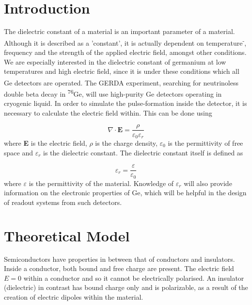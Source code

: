\documentclass[a4paper,11pt]{article}
\begin{document}
\section{Introduction}
\label{s:intro}


The dielectric constant of a material is an important parameter of a material. Although it is described as a 'constant', it is actually dependent on temperature\textsuperscript{\cite{benedict91}-\cite{fukuroi}}, frequency and the strength of the applied electric field, amongst other conditions. We are especially interested in the dielectric constant of germanium at low temperatures and high electric field, since it is under these conditions which all Ge detectors are operated. The GERDA experiment\textsuperscript{\cite{gerda}}, searching for neutrinoless double beta decay in \textsuperscript{76}Ge, will use high-purity Ge detectors operating in cryogenic liquid. In order to simulate the pulse-formation inside the detector, it is necessary to calculate the electric field within. This can be done using

\begin{equation}
	\label{e:poisson}
	\nabla\cdot\textbf{E} = \frac{\rho}{\varepsilon_{0}\varepsilon_{r}}
\end{equation}
where \textbf{E} is the electric field, $\rho$ is the charge density, $\varepsilon_{0}$ is the permittivity of free space and $\varepsilon_{r}$ is the dielectric constant. The dielectric constant itself is defined as

\begin{equation}
	\label{e:def}
	\varepsilon_{r} = \frac{\varepsilon}{\varepsilon_{0}}
\end{equation}
where $\varepsilon$ is the permittivity of the material. Knowledge of $\varepsilon_{r}$ will also provide information on the electronic properties of Ge, which will be helpful in the design of readout systems from such detectors.




\section{Theoretical Model}
\label{s:theoretical}

Semiconductors have properties in between that of conductors and insulators. Inside a conductor, both bound and free charge are present. The electric field $E = 0$ within a conductor and so it cannot be electrically polarised. An insulator (dielectric) in contrast has bound charge only and is polarizable, as a result of the creation of electric dipoles within the material.
\end{document}
